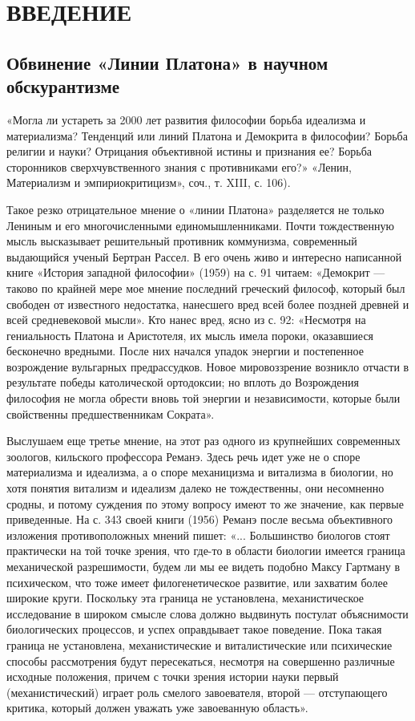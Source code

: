 \section{ВВЕДЕНИЕ}


\subsection{Обвинение «Линии Платона» в научном обскурантизме}

«Могла ли устареть  за 2000 лет развития философии  борьба идеализма и
материализма?  Тенденций или  линий Платона  и Демокрита  в философии?
Борьба религии и  науки? Отрицания объективной истины  и признания ее?
Борьба  сторонников  сверхчувственного  знания  с  противниками  его?»
«Ленин, Материализм и эмпириокритицизм», соч., т. XIII, с. 106).

Такое  резко  отрицательное  мнение   о  «линии  Платона»  разделяется
не  только  Лениным  и его  многочисленными  единомышленниками.  Почти
тождественную  мысль  высказывает  решительный  противник  коммунизма,
современный  выдающийся ученый  Бертран  Рассел. В  его  очень живо  и
интересно написанной  книге «История западной философии»  (1959) на с.
91 читаем: «Демокрит  --- таково по крайней мере  мое мнение последний
греческий  философ, который  был  свободен  от известного  недостатка,
нанесшего вред всей более поздней древней и всей средневековой мысли».
Кто нанес  вред, ясно из  с. 92:  «Несмотря на гениальность  Платона и
Аристотеля, их  мысль имела  пороки, оказавшиеся  бесконечно вредными.
После них начался упадок  энергии и постепенное возрождение вульгарных
предрассудков.  Новое  мировоззрение  возникло  отчасти  в  результате
победы  католической ортодоксии;  но вплоть  до Возрождения  философия
не  могла обрести  вновь  той энергии  и  независимости, которые  были
свойственны предшественникам Сократа».

Выслушаем  еще  третье  мнение,  на  этот  раз  одного  из  крупнейших
современных зоологов, кильского профессора Реманэ. Здесь речь идет уже
не  о  споре  материализма  и  идеализма,  а  о  споре  механицизма  и
витализма в  биологии, но хотя  понятия витализм и идеализм  далеко не
тождественны,  они  несомненно  сродны,  и потому  суждения  по  этому
вопросу  имеют то  же  значение,  как первые  приведенные.  На с.  343
своей  книги   (1956)  Реманэ  после  весьма   объективного  изложения
противоположных   мнений  пишет:   «...  Большинство   биологов  стоят
практически на той точке зрения, что где-то в области биологии имеется
граница механической разрешимости, будем ли мы ее видеть подобно Максу
Гартману в психическом, что  тоже имеет филогенетическое развитие, или
захватим более  широкие круги.  Поскольку эта граница  не установлена,
механистическое исследование  в широком смысле слова  должно выдвинуть
постулат  объяснимости биологических  процессов,  и успех  оправдывает
такое поведение.  Пока такая  граница не  установлена, механистические
и   виталистические  или   психические   способы  рассмотрения   будут
пересекаться,  несмотря на  совершенно  различные исходные  положения,
причем с  точки зрения  истории науки первый  (механистический) играет
роль  смелого завоевателя,  второй ---  отступающего критика,  который
должен уважать уже завоеванную область».

